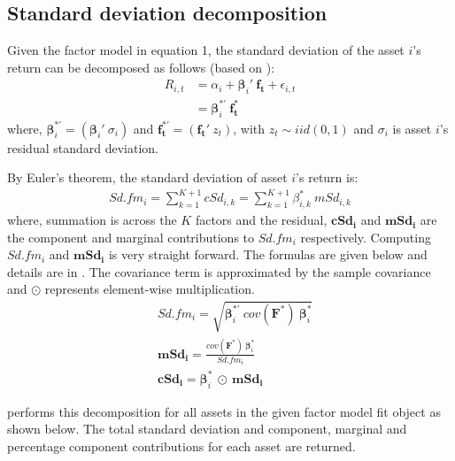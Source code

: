 \documentclass[a4paper]{article}\usepackage[]{graphicx}\usepackage[]{color}
\begin{document}
\subsection{Standard deviation decomposition}

Given the factor model in equation 1, the standard deviation of the asset $i$'s return can be decomposed as follows (based on \citet{meucci2007risk}):
\begin{align}
R_{i,t} &= \alpha_i + \bm\beta_i' \: \mathbf{f_t} + \epsilon_{i,t} \\
&=  \bm\beta_i^{*'} \: \mathbf{f_t^*}
\end{align}
where, $\bm\beta_i^{*'} = (\bm\beta_i' \: \sigma_i)$ and $\mathbf{f_t^{*'}} = (\mathbf{f_t'} \: z_t)$, with $z_t \sim iid(0, 1)$ and $\sigma_i$ is asset $i$'s residual standard deviation.

By Euler's theorem, the standard deviation of asset $i$'s return is:
\begin{align}
Sd.fm_i = \sum_{k=1}^{K+1} cSd_{i,k} = \sum_{k=1}^{K+1} \beta^*_{i,k} \: mSd_{i,k}
\end{align}
where, summation is across the $K$ factors and the residual, $\mathbf{cSd_i}$ and $\mathbf{mSd_i}$ are the component and marginal contributions to $Sd.fm_i$ respectively. Computing $Sd.fm_i$ and $\mathbf{mSd_i}$ is very straight forward. The formulas are given below and details are in \citet{meucci2007risk}. The covariance term is approximated by the sample covariance and $\odot$ represents element-wise multiplication.
\begin{align}
& Sd.fm_i = \sqrt{\bm\beta_i^{*'}\: cov(\mathbf{F^*})\: \bm\beta_i^*} \\
& \mathbf{mSd_i} = \frac{cov(\mathbf{F^*})\: \bm\beta_i^*}{Sd.fm_i} \\
& \mathbf{cSd_i} = \bm\beta_i^* \: \odot \: \mathbf{mSd_i}
\end{align}

 performs this decomposition for all assets in the given factor model fit object as shown below. The total standard deviation and component, marginal and percentage component contributions for each asset are returned.
\end{document}
